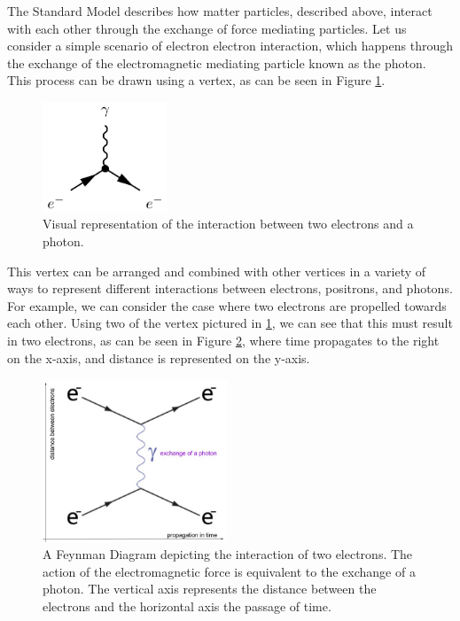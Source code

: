 The Standard Model describes how matter particles, described above, interact with each other through the exchange of force mediating particles. Let us consider a simple scenario of electron electron interaction, which happens through the exchange of the electromagnetic mediating particle known as the photon. This process can be drawn using a vertex, as can be seen in Figure \ref{Fig:Intro:Vertex1}. 
\begin{figure}[h]
    \centering
        \includegraphics[width=0.33\textwidth]{F1/Vertex1}
        \caption{Visual representation of the interaction between two electrons and a photon.}
        \label{Fig:Intro:Vertex1}
\end{figure}
This vertex can be arranged and combined with other vertices in a variety of ways to represent different interactions between electrons, positrons, and photons. For example, we can consider the case where two electrons are propelled towards each other. Using two of the vertex pictured in \ref{Fig:Intro:Vertex1}, we can see that this must result in two electrons, as can be seen in Figure \ref{Fig:Intro:Feynman1}, where time propagates to the right on the x-axis, and distance is represented on the y-axis. 
\begin{figure}[h]
    \centering
        \includegraphics[width=0.49\textwidth]{F1/FeynDiag1}
        \caption{A Feynman Diagram depicting the interaction of two electrons. The action of the electromagnetic force is equivalent to the exchange of a photon. The vertical axis represents the distance between the electrons and the horizontal axis the passage of time.}
        \label{Fig:Intro:Feynman1}
\end{figure}
